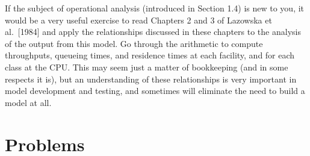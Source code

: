 If the subject of operational analysis (introduced in Section 1.4) is new to
you, it would be a very useful exercise to read Chapters 2 and 3 of Lazowska
et al.\ [1984] and apply the relationships discussed in these chapters to the
analysis of the output from this model. Go through the arithmetic to compute
throughputs, queueing times, and residence times at each facility, and for
 each class at the CPU. This may seem just a matter of bookkeeping (and in
some respects it is), but an understanding of these relationships is very
important in model development and testing, and sometimes will eliminate the
need to build a model at all.



\section{Problems}
\label{sec:smpl-problems}


